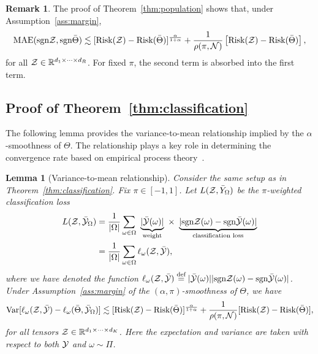 \documentclass[11pt]{article}
\theoremstyle{plain}
\newtheorem{lem}{Lemma}[section]
\theoremstyle{definition}
\newtheorem{rmk}{Remark}[section]
\newcommand*{\KeepStyleUnderBrace}[1]{%
  \mathop{%
    \mathchoice
    {\underbrace{\displaystyle#1}}%
    {\underbrace{\textstyle#1}}%
    {\underbrace{\scriptstyle#1}}%
    {\underbrace{\scriptscriptstyle#1}}%
  }\limits
}
\def\sign{\textup{sgn}}
\def\risk{\textup{Risk}}
\begin{document}
\begin{rmk}\label{eq:rmk}The proof of Theorem~\ref{thm:population} shows that, under Assumption~\ref{ass:margin}, 
\begin{equation}\label{eq:remark}
\textup{MAE}(\sign \tZ,\sign \bar \Theta)  \lesssim [\risk(\tZ)- \risk(\bar \Theta)]^{\alpha\over 1+\alpha}+{1\over \rho(\pi, \tN)} \left[\risk(\tZ)- \risk(\bar \Theta)\right],
\end{equation}
for all $\mathcal{Z}\in\mathbb{R}^{d_1\times \cdots \times d_R}$. For fixed $\pi$, the second term is absorbed into the first term. 
\end{rmk}

\subsection{Proof of Theorem~\ref{thm:classification}}
The following lemma provides the variance-to-mean relationship implied by the $\alpha$-smoothness of $\Theta$. The relationship plays a key role in determining the convergence rate based on empirical process theory~\citep{shen1994convergence}. 
\begin{lem}[Variance-to-mean relationship]\label{lem:variance}
Consider the same setup as in Theorem~\ref{thm:classification}. Fix $\pi\in[-1,1]$. Let $L(\mathcal{Z}, \bar Y_\Omega)$ be the $\pi$-weighted classification loss
\begin{align}\label{eq:sample2}
L(\tZ, \bar \tY_\Omega)&= {1\over |\Omega|}\sum_{\omega \in \Omega}\ \KeepStyleUnderBrace{|\bar \tY(\omega)|}_{\text{weight}}\  \times \ \KeepStyleUnderBrace{| \sign \tZ(\omega)-\sign \bar \tY(\omega)|}_{\text{classification loss}}\notag \\
&={1\over |\Omega|}\sum_{\omega \in \Omega}\ell_\omega(\tZ, \bar \tY),
\end{align}
where we have denoted the function $\ell_\omega(\tZ,\bar \tY)\stackrel{\text{def}}{=}|\bar \tY(\omega)||\sign\tZ(\omega)-\sign \bar \tY(\omega)|$. Under Assumption~\ref{ass:margin} of the $(\alpha,\pi)$-smoothness of $\Theta$, we have
\begin{equation}\label{eq:variance}
\textup{Var}[\ell_\omega(\mathcal{Z},\bar {\mathcal{Y}})-\ell_\omega(\bar \Theta, \bar {\mathcal{Y}}_\Omega)]\lesssim [\textup{Risk}(\mathcal{Z})-\textup{Risk}(\bar \Theta)]^{\alpha \over 1+\alpha}+{1\over \rho(\pi, \mathcal{N})}[\textup{Risk}(\mathcal{Z})-\textup{Risk}(\bar \Theta)],
\end{equation}
for all tensors $\mathcal{Z}\in\mathbb{R}^{d_1\times \cdots \times d_K}$. Here the expectation and variance are taken with respect to both $\mathcal{Y}$ and $\omega\sim \Pi$. 
\end{lem}
\end{document}
